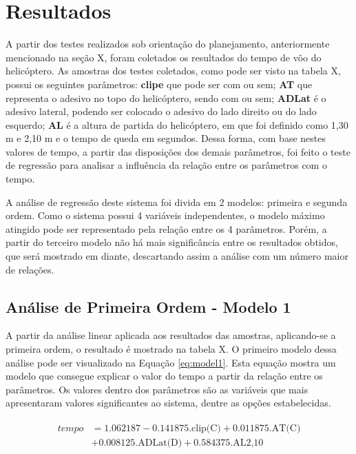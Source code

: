 \section{Resultados}
\label{sec:resultados}

A partir dos testes realizados sob orientação do planejamento, anteriormente mencionado na seção X, foram coletados os resultados do tempo de vôo do helicóptero. As amostras dos testes coletados, como pode ser visto na tabela X, possui os seguintes parâmetros: \textbf{clipe} que pode ser com ou sem; \textbf{AT} que representa o adesivo no topo do helicóptero, sendo com ou sem; \textbf{ADLat} é o adesivo lateral, podendo ser colocado o adesivo do lado direito ou do lado esquerdo; \textbf{AL} é a altura de partida do helicóptero, em que foi definido como 1,30 m e 2,10 m e o tempo de queda em segundos. Dessa forma, com base nestes valores de tempo, a partir das disposições dos demais parâmetros, foi feito o teste de regressão para analisar a influência da relação entre os parâmetros com o tempo.


A análise de regressão deste sistema foi divida em 2 modelos: primeira e segunda ordem. Como o sistema possui 4 variáveis independentes, o modelo máximo atingido pode ser representado pela relação entre os 4 parâmetros. Porém, a partir do terceiro modelo não há mais significância entre os resultados obtidos, que será mostrado em diante, descartando assim a análise com um número maior de relações. 

\subsection{Análise de Primeira Ordem - Modelo 1}

A partir da análise linear aplicada aos resultados das amostras, aplicando-se a primeira ordem, o resultado é mostrado na tabela X. O primeiro modelo dessa análise pode ser visualizado na Equação \ref{eq:model1}. Esta equação mostra um modelo que consegue explicar o valor do tempo a partir da relação entre os parâmetros. Os valores dentro dos parâmetros são as variáveis que mais apresentaram valores significantes ao sistema, dentre as opções estabelecidas. 


\begin{align}
    \begin{split}
    tempo &= 1.062187 - 0.141875\text{.clip(C)} + 0.011875\text{.AT(C)} \\
    & + 0.008125\text{.ADLat(D)} + 0.584375\text{.AL2,10}
    \end{split}
    \label{eq:model1}
\end{align}

